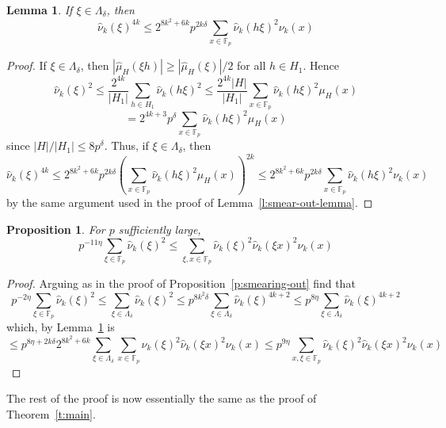 \documentclass[11pt]{amsart}
\newtheorem{lem}[thm]{Lemma}
\newtheorem{prop}[thm]{Proposition}
\newcommand{\fp}{\mathbb{F}_p}
\newcommand{\muh}{{\mu_H}}
\newcommand{\nuhat}{{\widehat{\nu}}}
\newcommand{\muhat}{{\widehat{\mu}}}
\newcommand{\nuk}{{\nu_k}}
\begin{document}
\begin{lem}
\label{l:substitute-one}
If $\xi \in \Lambda_\delta$, then 
$$
\nuhat_k(\xi)^{4k}
\leq 
2^{8k^2+6k} p^{2k \delta}
\sum_{x \in \fp}
\nuhat_k(h \xi)^2  
\nuk(x) 
$$  
\end{lem}
\begin{proof}
If $\xi \in \Lambda_\delta$, then $|\muhat_H(\xi h)| \geq |\muhat_H(\xi
)|/2$ for all $h \in H_1$.  Hence
$$
\nuhat_k(\xi)^2 \leq
\frac{2^{4k}}{|H_1|}
\sum_{h  \in H_1} \nuhat_k(h \xi)^2  
\leq
\frac{2^{4k}|H|}{|H_1|}
\sum_{x \in \fp}
\nuhat_k(h \xi)^2  
\muh(x)$$
$$
=
2^{4k+3}p^{\delta}
\sum_{x \in \fp}
\nuhat_k(h \xi)^2  
\muh(x)
$$
since $|H|/|H_1| \leq 8p^{\delta}$.  
Thus, if $\xi \in \Lambda_\delta$, then
$$
\nuhat_k(\xi)^{4k} \leq
2^{8k^2+6k} p^{2k \delta}
\left( \sum_{x \in \fp}
\nuhat_k(h \xi)^2  
\muh(x) \right)^{2k}
\leq 
2^{8k^2+6k} p^{2k \delta}
\sum_{x \in \fp}
\nuhat_k(h \xi)^2  
\nuk(x) 
$$
by the same argument used in the proof of
Lemma~\ref{l:smear-out-lemma}. 
\end{proof}
\begin{prop}
For $p$ sufficiently large, 
$$
p^{-11\eta}
\sum_{\xi \in \fp}
\nuhat_k(\xi)^2
\leq
\sum_{\xi,x \in \fp}
\nuhat_k(\xi)^2
\nuhat_k(\xi x)^2
\nu_k(x)
$$
\end{prop}
\begin{proof}
Arguing as in the proof of Proposition~\ref{p:smearing-out} find that 
$$
p^{-2\eta}
\sum_{\xi \in \fp}
\nuhat_k(\xi)^2
\leq 
\sum_{\xi \in \Lambda_\delta}
\nuhat_k(\xi)^2
\leq
p^{8 k^2 \delta}
\sum_{\xi \in \Lambda_\delta}
\nuhat_k(\xi)^{4k+2}
\leq 
p^{8\eta}
\sum_{\xi \in \Lambda_\delta}
\nuhat_k(\xi)^{4k+2}
$$  
which, by Lemma~\ref{l:substitute-one} is 
$$
\leq
p^{8 \eta + 2k\delta}
2^{8k^2+6k}
\sum_{\xi \in \Lambda_\delta}
\sum_{x \in \fp}
\nuhat_k(\xi)^{2}
\nuhat_k(\xi x)^{2}
\nuk(x)
\leq
p^{9\eta}
\sum_{x, \xi \in \fp}
\nuhat_k(\xi)^{2}
\nuhat_k(\xi x)^{2}
\nuk(x)
$$
\end{proof}
%
The rest of the proof is now essentially the same as the proof of
Theorem~\ref{t:main}. 


%
%
\end{document}
